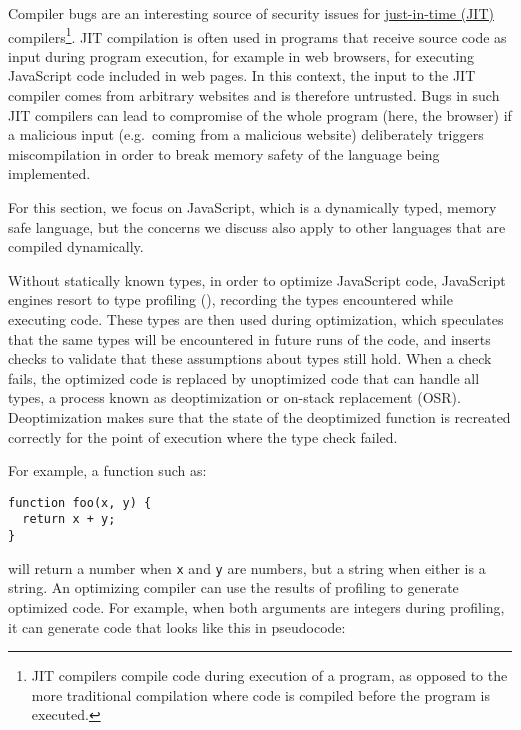 \documentclass[
  a4paper,
]{report}
\begin{document}
Compiler bugs are an interesting source of security issues for
\label{__index_entry_91}{\href{https://en.wikipedia.org/wiki/Just-in-time_compilation}{just-in-time
(JIT)} compilers}\footnote{JIT
  compilers compile code during execution of a program, as opposed to
  the more traditional compilation where code is compiled before the
  program is executed.}. JIT compilation is often used in programs that
receive source code as input during program execution, for example in
web browsers, for executing JavaScript code included in web pages. In
this context, the input to the JIT compiler comes from arbitrary
websites and is therefore untrusted. Bugs in such JIT compilers can lead
to compromise of the whole program (here, the browser) if a malicious
input (e.g.~coming from a malicious website) deliberately triggers
miscompilation in order to break memory safety of the language being
implemented.

For this section, we focus on JavaScript, which is a dynamically typed,
memory safe language, but the concerns we discuss also apply to other
languages that are compiled dynamically.

Without statically known types, in order to optimize JavaScript code,
JavaScript engines resort to type profiling
(), recording the types encountered
while executing code. These types are then used during optimization,
which speculates that the same types will be encountered in future runs
of the code, and inserts checks to validate that these assumptions about
types still hold. When a check fails, the optimized code is replaced by
unoptimized code that can handle all types, a process known as
\label{__index_entry_92}{deoptimization}
or \label{__index_entry_93}{on-stack replacement
(OSR)}. Deoptimization makes sure that
the state of the deoptimized function is recreated correctly for the
point of execution where the type check failed.

For example, a function such as:

\begin{verbatim}
function foo(x, y) {
  return x + y;
}
\end{verbatim}

will return a number when \texttt{x} and \texttt{y} are numbers, but a
string when either is a string. An optimizing compiler can use the
results of profiling to generate optimized code. For example, when both
arguments are integers during profiling, it can generate code that looks
like this in pseudocode:
\end{document}

